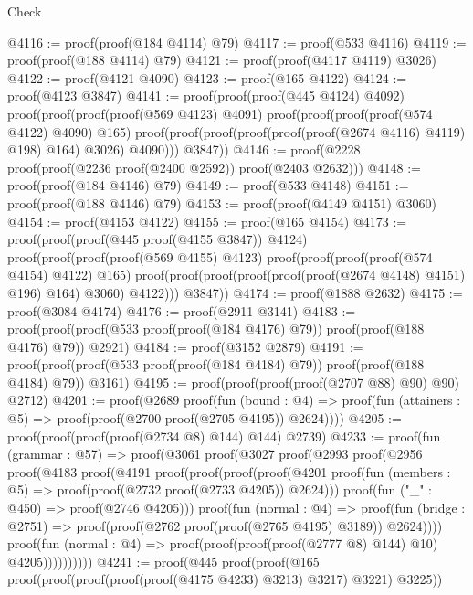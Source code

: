 \begin{lexlean}{Check}
\begin{coremodule}
@4116 := proof(proof(@184 @4114) @79)
@4117 := proof(@533 @4116)
@4119 := proof(proof(@188 @4114) @79)
@4121 := proof(proof(@4117 @4119) @3026)
@4122 := proof(@4121 @4090)
@4123 := proof(@165 @4122)
@4124 := proof(@4123 @3847)
@4141 := proof(proof(proof(@445 @4124) @4092)
      proof(proof(proof(proof(@569 @4123) @4091)
            proof(proof(proof(proof(@574 @4122) @4090) @165)
                proof(proof(proof(proof(proof(proof(@2674 @4116) @4119) @198) @164) @3026) @4090)))
          @3847))
@4146 := proof(@2228 proof(proof(@2236 proof(@2400 @2592)) proof(@2403 @2632)))
@4148 := proof(proof(@184 @4146) @79)
@4149 := proof(@533 @4148)
@4151 := proof(proof(@188 @4146) @79)
@4153 := proof(proof(@4149 @4151) @3060)
@4154 := proof(@4153 @4122)
@4155 := proof(@165 @4154)
@4173 := proof(proof(proof(@445 proof(@4155 @3847)) @4124)
      proof(proof(proof(proof(@569 @4155) @4123)
            proof(proof(proof(proof(@574 @4154) @4122) @165)
                proof(proof(proof(proof(proof(proof(@2674 @4148) @4151) @196) @164) @3060) @4122)))
          @3847))
@4174 := proof(@1888 @2632)
@4175 := proof(@3084 @4174)
@4176 := proof(@2911 @3141)
@4183 := proof(proof(proof(@533 proof(proof(@184 @4176) @79)) proof(proof(@188 @4176) @79)) @2921)
@4184 := proof(@3152 @2879)
@4191 := proof(proof(proof(@533 proof(proof(@184 @4184) @79)) proof(proof(@188 @4184) @79)) @3161)
@4195 := proof(proof(proof(proof(@2707 @88) @90) @90) @2712)
@4201 := proof(@2689
      proof(fun (bound : @4) =>
        proof(fun (attainers : @5) => proof(proof(@2700 proof(@2705 @4195)) @2624))))
@4205 := proof(proof(proof(proof(@2734 @8) @144) @144) @2739)
@4233 := proof(fun (grammar : @57) =>
    proof(@3061
        proof(@3027
            proof(@2993
                proof(@2956
                    proof(@4183
                        proof(@4191
                            proof(proof(proof(proof(@4201
                                      proof(fun (members : @5) =>
                                        proof(proof(@2732 proof(@2733 @4205)) @2624)))
                                    proof(fun ("_" : @450) => proof(@2746 @4205)))
                                  proof(fun (normal : @4) =>
                                    proof(fun (bridge : @2751) =>
                                      proof(proof(@2762 proof(proof(@2765 @4195) @3189)) @2624))))
                                proof(fun (normal : @4) =>
                                  proof(proof(proof(proof(@2777 @8) @144) @10) @4205))))))))))
@4241 := proof(@445
      proof(proof(@165 proof(proof(proof(proof(proof(@4175 @4233) @3213) @3217) @3221) @3225))

\end{coremodule}
\end{lexlean}
